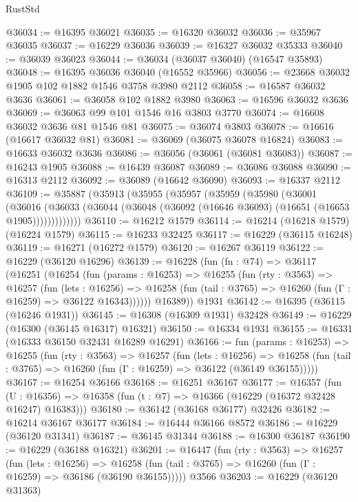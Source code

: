 \begin{lexlean}{RustStd}
\begin{coremodule}
@36034 := @16395 @36021
@36035 := @16320 @36032
@36036 := @35967 @36035
@36037 := @16229 @36036
@36039 := @16327 @36032 @35333
@36040 := @36039 @36023
@36044 := @36034 (@36037 @36040) (@16547 @35893)
@36048 := @16395 @36036 @36040 (@16552 @35966)
@36056 := @23668 @36032 @1905 @102 @1882 @1546 @3758 @3980 @2112
@36058 := @16587 @36032 @3636
@36061 := @36058 @102 @1882 @3980
@36063 := @16596 @36032 @3636
@36069 := @36063 @99 @101 @1546 @16 @3803 @3770
@36074 := @16608 @36032 @3636 @81 @1546 @81
@36075 := @36074 @3803
@36078 := @16616 (@16617 @36032 @81)
@36081 := @36069 (@36075 @36078 @16824)
@36083 := @16633 @36032 @3636
@36086 := @36056 (@36061 (@36081 @36083))
@36087 := @16243 @1905
@36088 := @16439 @36087
@36089 := @36086 @36088
@36090 := @16313 @2112
@36092 := @36089 (@16642 @36090)
@36093 := @16337 @2112
@36109 := @35887
    (@35913
      (@35955
        (@35957
          (@35959
            (@35980
              (@36001
                (@36016
                  (@36033 (@36044 (@36048 (@36092 (@16646 @36093) (@16651 (@16653 @1905)))))))))))))
@36110 := @16212 @1579
@36114 := @16214 (@16218 @1579) (@16224 @1579)
@36115 := @16233 @32425
@36117 := @16229 (@36115 @16248)
@36119 := @16271 (@16272 @1579)
@36120 := @16267 @36119
@36122 := @16229 (@36120 @16296)
@36139 := @16228
    (fun (fn : @74) =>
    @36117
      (@16251
        (@16254
          (fun (params : @16253) =>
          @16255
            (fun (rty : @3563) =>
            @16257
              (fun (lets : @16256) =>
              @16258 (fun (tail : @3765) => @16260 (fun (Γ : @16259) => @36122 @16343))))))
        @16389))
    @1931
@36142 := @16395 (@36115 (@16246 @1931))
@36145 := @16308 (@16309 @1931) @32428
@36149 := @16229 (@16300 (@36145 @16317) @16321)
@36150 := @16334 @1931
@36155 := @16331 (@16333 @36150 @32431 @16289 @16291)
@36166 := fun (params : @16253) =>
  @16255
    (fun (rty : @3563) =>
    @16257
      (fun (lets : @16256) =>
      @16258 (fun (tail : @3765) => @16260 (fun (Γ : @16259) => @36122 (@36149 @36155)))))
@36167 := @16254 @36166
@36168 := @16251 @36167
@36177 := @16357
    (fun (U : @16356) => @16358 (fun (t : @7) => @16366 (@16229 (@16372 @32428 @16247) @16383)))
@36180 := @36142 (@36168 @36177) @32426
@36182 := @16214 @36167 @36177
@36184 := @16444 @36166 @8572
@36186 := @16229 (@36120 @31341)
@36187 := @36145 @31344
@36188 := @16300 @36187
@36190 := @16229 (@36188 @16321)
@36201 := @16447
    (fun (rty : @3563) =>
    @16257
      (fun (lets : @16256) =>
      @16258 (fun (tail : @3765) => @16260 (fun (Γ : @16259) => @36186 (@36190 @36155)))))
    @3566
@36203 := @16229 (@36120 @31363)

\end{coremodule}
\end{lexlean}
